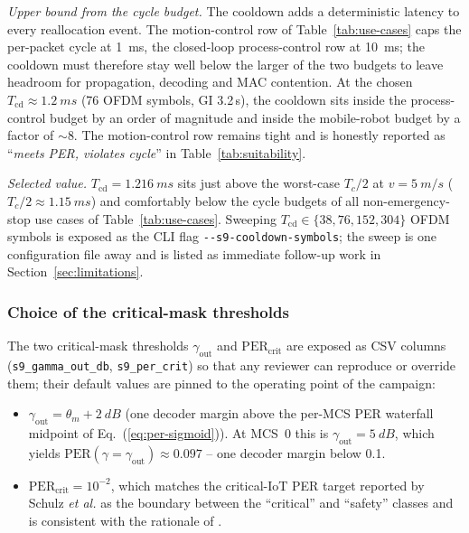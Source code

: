 \documentclass[journal,onecolumn,11pt,a4paper]{IEEEtran}
\newcommand{\percrit}{\mathrm{PER}_{\mathrm{crit}}}
\newcommand{\gout}{\gamma_{\mathrm{out}}}
\begin{document}
\emph{Upper bound from the cycle budget.} The cooldown adds a
deterministic latency to every reallocation event. The motion-control
row of Table~\ref{tab:use-cases} caps the per-packet cycle at
\SI{1}{ms}, the closed-loop process-control row at \SI{10}{ms};
the cooldown must therefore stay well below the larger of the
two budgets to leave headroom for propagation, decoding and MAC
contention. At the chosen $T_{\mathrm{cd}} \approx \SI{1.2}{ms}$
(76 OFDM symbols, GI 3.2\,\textmu s), the cooldown sits inside
the process-control budget by an order of magnitude and inside
the mobile-robot budget by a factor of $\sim$8. The motion-control
row remains tight and is honestly reported as
``\emph{meets PER, violates cycle}'' in
Table~\ref{tab:suitability}.

\emph{Selected value.} $T_{\mathrm{cd}} = \SI{1.216}{ms}$ sits
just above the worst-case $T_c/2$ at $v=\SI{5}{m/s}$ ($T_c/2
\approx \SI{1.15}{ms}$) and comfortably below the cycle budgets of
all non-emergency-stop use cases of Table~\ref{tab:use-cases}.
Sweeping $T_{\mathrm{cd}} \in \{38, 76, 152, 304\}$ OFDM symbols is
exposed as the CLI flag \texttt{-{}-s9-cooldown-symbols}; the
sweep is one configuration file away and is listed as immediate
follow-up work in Section~\ref{sec:limitations}.

\subsubsection{Choice of the critical-mask thresholds}
\label{sec:s9-thresholds}

The two critical-mask thresholds $\gout$ and $\percrit$ are
exposed as CSV columns (\texttt{s9\_gamma\_out\_db},
\texttt{s9\_per\_crit}) so that any reviewer can reproduce or
override them; their default values are pinned to the operating
point of the campaign:

\begin{itemize}
  \item $\gout = \theta_m + \SI{2}{dB}$ (one decoder margin above
        the per-MCS PER waterfall midpoint of
        Eq.~(\ref{eq:per-sigmoid})). At MCS~0 this is
        $\gout=\SI{5}{dB}$, which yields
        $\mathrm{PER}(\gamma=\gout)\approx 0.097$ -- one decoder
        margin below \SI{0.1}{}.
  \item $\percrit = 10^{-2}$, which matches the critical-IoT PER
        target reported by Schulz \emph{et al.}\xspace \cite{Sch17} as the
        boundary between the ``critical'' and ``safety'' classes
        and is consistent with the rationale of \cite{Fan22}.
\end{itemize}
\end{document}
